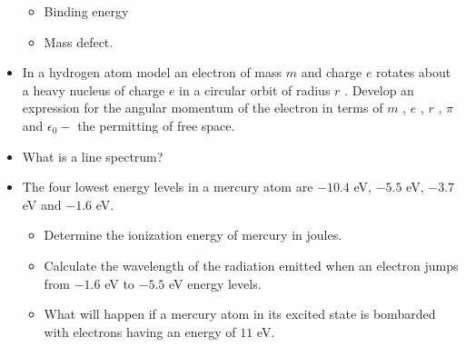 \documentclass{article}
\begin{document}
\begin{itemize}
\begin{itemize}
\item Binding energy
\item Mass defect.
\end{itemize}
\item In a hydrogen atom model an electron of mass $ m$ and charge $ e$ rotates about a heavy nucleus of charge $ e$ in a circular orbit of radius $ r$ . Develop an expression for the angular momentum of the electron in terms of $ m$ , $ e$ , $ r$ , $ \pi$ and $ \epsilon  _{0}-$ the permitting of free space.
\item What is a line spectrum? 
\item The four lowest energy levels in a mercury atom are $ -10.4$ eV, $ -5.5$ eV, $ -3.7$ eV and $ -1.6$ eV.
 \begin{itemize}
\item Determine the ionization energy of mercury in joules. 
\item Calculate the wavelength of the radiation emitted when an electron jumps from $ -1.6$ eV to $ -5.5$ eV energy levels. 
\item What will happen if a mercury atom in its excited state is bombarded with electrons having an energy of $ 11$ eV. 
\end{itemize}
\end{itemize}
\end{document}
